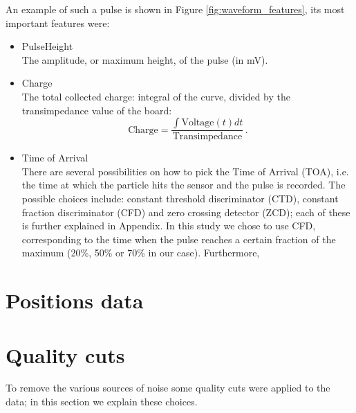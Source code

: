 An example of such a pulse is shown in Figure \ref{fig:waveform_features}, its most important features were:

\begin{itemize}
    \item PulseHeight\\
The amplitude, or maximum height, of the pulse (in mV).
    \item Charge\\
The total collected charge: integral of the curve, divided by the transimpedance value of the board:
        \begin{equation}
            \text{Charge} = \frac{\int \text{Voltage}(t)dt}{\text{Transimpedance}} \, .
        \end{equation}
    \item Time of Arrival\\
There are several possibilities on how to pick the Time of Arrival (TOA), i.e. the time at which the particle hits the sensor and the pulse is recorded.
The possible choices include: constant threshold discriminator (CTD), constant fraction discriminator (CFD) and zero crossing detector (ZCD); each of these is further explained in Appendix. 
In this study we chose  to use CFD, corresponding to the time when the pulse reaches a certain fraction of the maximum (20\%, 50\% or 70\% in our case).
Furthermore,
\end{itemize}


\section{Positions data}

\section{Quality cuts}\label{sec:qualtiy_cuts}
To remove the various sources of noise some quality cuts were applied to the data; in this section we explain these choices.


